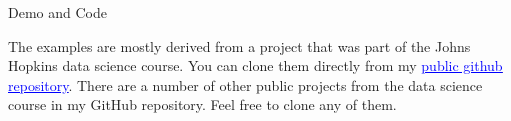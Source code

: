\documentclass{beamer}
\begin{document}
\begin{frame}{
	\begin{minipage}[t]{0.75\textwidth}
		Demo and Code
	\end{minipage}
	\hfill
	\begin{minipage}[t]{0.25\textwidth}
		\flushright
	\end{minipage}
}{}
The examples are mostly derived from a project that was part of the Johns Hopkins data science course. You can clone them directly from my \href{https://github.com/gseamans}{\textcolor{blue}{\underline{public github repository}}}. There are a number of other public projects from the data science course in my GitHub repository. Feel free to clone any of them.

\end{frame}
\end{document}

